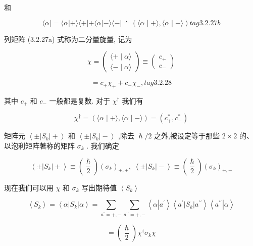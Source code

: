 和

$$
\langle \alpha \left| { = \langle \alpha }\right| + \rangle \langle + \left| {+\langle \alpha }\right| - \rangle \langle - | \doteq \left( {\langle \alpha \mid + \rangle ,\langle \alpha \mid - \rangle }\right) tag{3.2.27b}
$$

列矩阵 (3.2.27a) 式称为二分量旋量, 记为

$$
\chi = \left( \begin{array}{l} \langle + \mid \alpha \rangle \\ \langle - \mid \alpha \rangle \end{array}\right) \equiv \left( \begin{array}{l} {c}_{ + } \\ {c}_{ - } \end{array}\right)
$$

$$
= {c}_{ + }{\chi }_{ + } + {c}_{ - }{\chi }_{ - }, tag{3.2.28}
$$


其中 ${c}_{ + }$ 和 ${c}_{ - }$ 一般都是复数. 对于 ${\chi }^{ \dagger }$ 我们有

$$
{\chi }^{ \dagger } = \left( {\langle \alpha \mid + \rangle ,\langle \alpha \mid - \rangle }\right) = \left( {{c}_{ + }^{ * },{c}_{ - }^{ * }}\right) 
$$

矩阵元 $\left\langle {\pm \left| {S}_{k}\right| + }\right\rangle$ 和 $\left\langle {\pm \left| {S}_{k}\right| - }\right\rangle$ ,除去 $\hslash /2$ 之外,被设定等于那些 $2 \times 2$ 的、以泡利矩阵著称的矩阵 ${\sigma }_{k}$ . 我们确定

$$
\left\langle {\pm \left| {S}_{k}\right| + }\right\rangle \equiv \left( \frac{\hslash }{2}\right) {\left( {\sigma }_{k}\right) }_{\pm , + },\;\left\langle {\pm \left| {S}_{k}\right| - }\right\rangle \equiv \left( \frac{\hslash }{2}\right) {\left( {\sigma }_{k}\right) }_{\pm , - }
$$

现在我们可以用 $\chi$ 和 ${\sigma }_{k}$ 写出期待值 $\left\langle {S}_{k}\right\rangle$

$$
\left\langle {S}_{k}\right\rangle = \left\langle {\alpha \left| {S}_{k}\right| \alpha }\right\rangle = \mathop{\sum }\limits_{{{a}^{\prime } = + , - }}\mathop{\sum }\limits_{{{a}^{\prime \prime } = + , - }}\left\langle {\alpha \left| {a}^{\prime }\right\rangle \left\langle {{a}^{\prime }\left| {S}_{k}\right| {a}^{\prime \prime }}\right\rangle \left\langle {a}^{\prime \prime }\right| \alpha }\right\rangle 
$$

$$
= \left( \frac{\hslash }{2}\right) {\chi }^{ \dagger }{\sigma }_{k}\chi
$$

